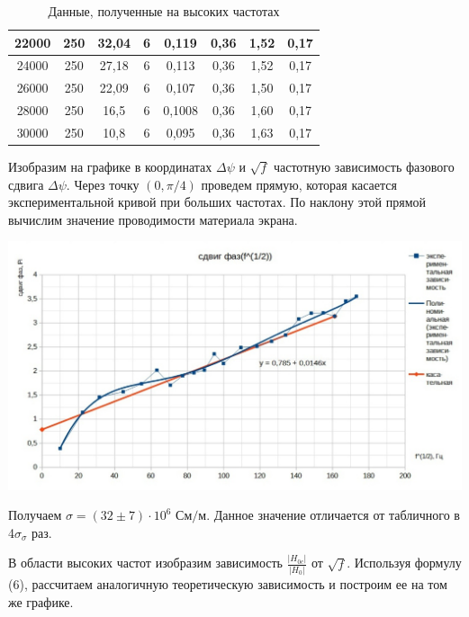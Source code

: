 \documentclass[a4paper,12pt]{report}
\begin{document}
\begin{table}[!ht]
\begin{tabular}{|c|c|c|c|c|c|c|c|}
22000 & 250         & 32,04 & 6       & 0,119  & 0,36       & 1,52      & 0,17           \\ \hline
24000 & 250         & 27,18 & 6       & 0,113  & 0,36       & 1,52      & 0,17           \\ \hline
26000 & 250         & 22,09 & 6       & 0,107  & 0,36       & 1,50      & 0,17           \\ \hline
28000 & 250         & 16,5  & 6       & 0,1008 & 0,36       & 1,60      & 0,17           \\ \hline
30000 & 250         & 10,8  & 6       & 0,095  & 0,36       & 1,63      & 0,17           \\ \hline
\end{tabular}
\begin{center}
\caption{Данные, полученные на высоких частотах}
\end{center}
\end{table}

Изобразим на графике в координатах $\Delta \psi$ и $\sqrt{f}$ частотную зависимость фазового сдвига $\Delta \psi$. Через точку $(0, \pi / 4)$ проведем прямую, которая касается экспериментальной кривой при больших частотах. По наклону этой прямой вычислим значение проводимости материала экрана. 

\begin{center}
	\includegraphics[width=1.0\textwidth]{большие частоты.jpg}
\end{center}

Получаем \( \sigma = (32 \pm 7) \cdot 10^6 \text{ См/м}\). Данное значение отличается от табличного в 4$\sigma_{\sigma}$ раз.

В области высоких частот изобразим зависимость $\frac{|H_{0c}|}{|H_0|}$ от $\sqrt{f}$. Используя формулу (6), рассчитаем аналогичную теоретическую зависимость и построим ее на том же графике.
\end{document}
